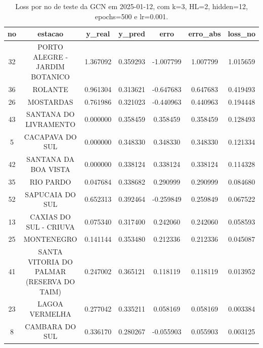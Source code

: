 \begin{table}[h]
\centering
\caption{Loss por no de teste da GCN em 2025-01-12, com k=3, HL=2, hidden=12, epochs=500 e lr=0.001.}
\label{tab:gcn_loss_k3_hl2_h12_e500_d20250112}
\begin{tabular}{ccccccc}
\toprule
no & estacao & y\_real & y\_pred & erro & erro\_abs & loss\_no \\
\midrule
32 & PORTO ALEGRE - JARDIM BOTANICO & 1.367092 & 0.359293 & -1.007799 & 1.007799 & 1.015659 \\
36 & ROLANTE & 0.961304 & 0.313621 & -0.647683 & 0.647683 & 0.419493 \\
26 & MOSTARDAS & 0.761986 & 0.321023 & -0.440963 & 0.440963 & 0.194448 \\
43 & SANTANA DO LIVRAMENTO & 0.000000 & 0.358459 & 0.358459 & 0.358459 & 0.128493 \\
5 & CACAPAVA DO SUL & 0.000000 & 0.348330 & 0.348330 & 0.348330 & 0.121334 \\
42 & SANTANA DA BOA VISTA & 0.000000 & 0.338124 & 0.338124 & 0.338124 & 0.114328 \\
35 & RIO PARDO & 0.047684 & 0.338682 & 0.290999 & 0.290999 & 0.084680 \\
52 & SAPUCAIA DO SUL & 0.652313 & 0.392464 & -0.259849 & 0.259849 & 0.067522 \\
13 & CAXIAS DO SUL - CRIUVA & 0.075340 & 0.317400 & 0.242060 & 0.242060 & 0.058593 \\
25 & MONTENEGRO & 0.141144 & 0.353480 & 0.212336 & 0.212336 & 0.045087 \\
41 & SANTA VITORIA DO PALMAR (RESERVA DO TAIM) & 0.247002 & 0.365121 & 0.118119 & 0.118119 & 0.013952 \\
23 & LAGOA VERMELHA & 0.277042 & 0.335211 & 0.058169 & 0.058169 & 0.003384 \\
8 & CAMBARA DO SUL & 0.336170 & 0.280267 & -0.055903 & 0.055903 & 0.003125 \\
\bottomrule
\end{tabular}
\end{table}

